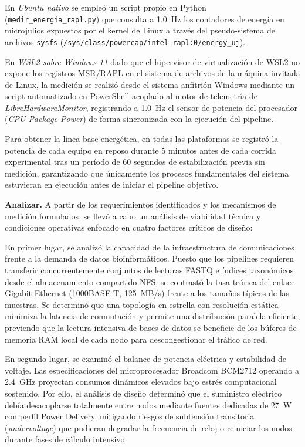 \documentclass[12pt,oneside,spanish]{book}
\begin{document}
    En \textit{Ubuntu nativo} se empleó un script propio en Python (\texttt{medir\_energia\_rapl.py}) que consulta a 1.0~Hz los contadores de energía en microjulios expuestos por el kernel de Linux a través del pseudo-sistema de archivos \texttt{sysfs} (\texttt{/sys/}\allowbreak\texttt{class/}\allowbreak\texttt{powercap/}\allowbreak\texttt{intel-rapl:0/}\allowbreak\texttt{energy\_uj}).
    
    En \textit{WSL2 sobre Windows 11} dado que el hipervisor de virtualización de WSL2 no expone los registros MSR/RAPL en el sistema de archivos de la máquina invitada de Linux, la medición se realizó desde el sistema anfitrión Windows mediante un script automatizado en PowerShell acoplado al motor de telemetría de \textit{LibreHardwareMonitor}, registrando a 1.0~Hz el sensor de potencia del procesador (\textit{CPU Package Power}) de forma sincronizada con la ejecución del pipeline.
    
    Para obtener la línea base energética, en todas las plataformas se registró la potencia de cada equipo en reposo durante 5 minutos antes de cada corrida experimental tras un período de 60 segundos de estabilización previa sin medición, garantizando que únicamente los procesos fundamentales del sistema estuvieran en ejecución antes de iniciar el pipeline objetivo.
    
    
    
    
    
    \textbf{Analizar.} A partir de los requerimientos identificados y los mecanismos de medición formulados, se llevó a cabo un análisis de viabilidad técnica y condiciones operativas enfocado en cuatro factores críticos de diseño:

    En primer lugar, se analizó la capacidad de la infraestructura de comunicaciones frente a la demanda de datos bioinformáticos. Puesto que los pipelines requieren transferir concurrentemente conjuntos de lecturas FASTQ e índices taxonómicos desde el almacenamiento compartido NFS, se contrastó la tasa teórica del enlace Gigabit Ethernet (1000BASE-T, 125~MB/s) frente a los tamaños típicos de las muestras. Se determinó que una topología en estrella con resolución estática minimiza la latencia de conmutación y permite una distribución paralela eficiente, previendo que la lectura intensiva de bases de datos se beneficie de los búferes de memoria RAM local de cada nodo para descongestionar el tráfico de red.

    En segundo lugar, se examinó el balance de potencia eléctrica y estabilidad de voltaje. Las especificaciones del microprocesador Broadcom BCM2712 operando a 2.4~GHz proyectan consumos dinámicos elevados bajo estrés computacional sostenido. Por ello, el análisis de diseño determinó que el suministro eléctrico debía desacoplarse totalmente entre nodos mediante fuentes dedicadas de 27~W con perfil Power Delivery, mitigando riesgos de subtensión transitoria (\textit{undervoltage}) que pudieran degradar la frecuencia de reloj o reiniciar los nodos durante fases de cálculo intensivo.
\end{document}
